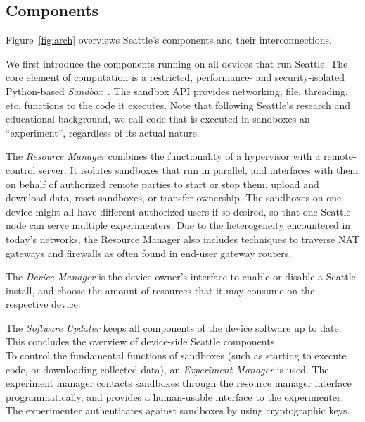 \subsection{Components}

Figure~\ref{fig:arch} overviews Seattle's components and their
interconnections.

We first introduce the components running on all devices that
run Seattle.
The core element of computation is a restricted,
performance- and security-isolated Python-based
\textit{Sandbox}~\cite{RepySandbox,li2015fence}.
The sandbox \gls{API} provides
networking, file, threading, etc. functions to
the code it executes. Note that
following Seattle's research and educational background, we
call code that is executed in sandboxes an ``experiment'',
regardless of its actual nature.

The \textit{Resource Manager} combines the functionality of
a hypervisor with a remote-control server.
It isolates %
sandboxes that run in
parallel, and interfaces with them on behalf of authorized remote
parties to start or stop them, upload and download data, reset
sandboxes, or transfer ownership. The sandboxes on one
device might all have different authorized users if so desired,
so that one Seattle node can serve multiple experimenters.
Due to the heterogeneity encountered in today's networks,
the Resource Manager also includes techniques to traverse
\gls{NAT} gateways and firewalls as often found in end-user
gateway routers.

The \textit{Device Manager} %
is the device owner's interface to enable or disable a Seattle
install, and choose the amount of resources that it may consume on the respective
device.

The \textit{Software Updater} keeps all components of the
device software up to date. This concludes the overview of
device-side Seattle components.
\\

To control the fundamental functions of sandboxes (such as
starting to execute code, or downloading collected data),
an \textit{Experiment Manager} %
is used. The experiment manager contacts sandboxes through the
resource manager interface programmatically, and provides a
human-usable interface to the experimenter. The experimenter
authenticates against sandboxes by using cryptographic keys.

